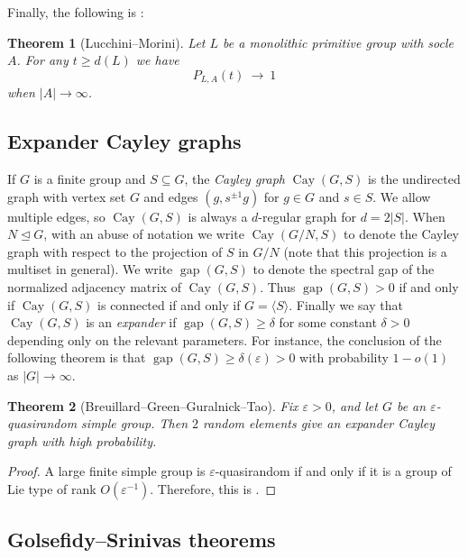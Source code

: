 \documentclass[11pt,reqno]{amsart}
\numberwithin{equation}{section}
\newtheorem{theorem}{Theorem}[section]
\theoremstyle{definition}
\theoremstyle{remark}
\newcommand{\Cay}{\mathop{\mathrm{Cay}}}
\newcommand{\gap}{\mathop{\mathrm{gap}}}
\begin{document}
Finally, the following is \cite[Theorem~1.1]{LM02}:

\begin{theorem}[Lucchini--Morini] \label{thLM}
Let $L$ be a monolithic primitive group with socle $A$.
For any $t \geq d(L)$ we have
$$ P_{L,A}(t) \> \to \> 1 $$
when $|A| \to \infty$.
\end{theorem}








\subsection{Expander Cayley graphs}

If $G$ is a finite group and $S \subseteq G$, the \emph{Cayley graph} $\Cay(G,S)$ is the undirected
graph with vertex set $G$ and edges $(g, s^{\pm 1} g)$ for $g \in G$ and $s \in S$.
We allow multiple edges, so $\Cay(G,S)$ is always a $d$-regular graph for $d= 2|S|$.
When $N \unlhd G$, with an abuse of notation we write $\Cay(G/N,S)$
to denote the Cayley graph with respect to the projection of $S$ in $G/N$
(note that this projection is a multiset in general).
We write $\gap(G,S)$ to denote the spectral gap of the normalized adjacency matrix of $\Cay(G,S)$.
Thus $\gap(G,S) >0$ if and only if $\Cay(G,S)$ is connected if and only if $G=\langle S \rangle$.
Finally we say that $\Cay(G,S)$ is an \emph{expander} if $\gap(G,S) \geq \delta$
for some constant $\delta >0$ depending only
on the relevant parameters.
For instance, the conclusion of the following theorem is that
$\gap(G,S) \geq \delta(\varepsilon) >0$ with probability $1-o(1)$ as $|G| \to \infty$.

\begin{theorem}[Breuillard--Green--Guralnick--Tao] \label{thBGGT}
Fix $\varepsilon >0$, and let $G$ be an $\varepsilon$-quasirandom simple group.
Then $2$ random elements give an expander Cayley graph with high probability.
\end{theorem}
\begin{proof}
A large finite simple group is $\varepsilon$-quasirandom if and only if
it is a group of Lie type of rank $O(\varepsilon^{-1})$.
Therefore, this is \cite[Theorem~1.2]{BGGT15}.
\end{proof}

\subsection{Golsefidy--Srinivas theorems}
\end{document}
